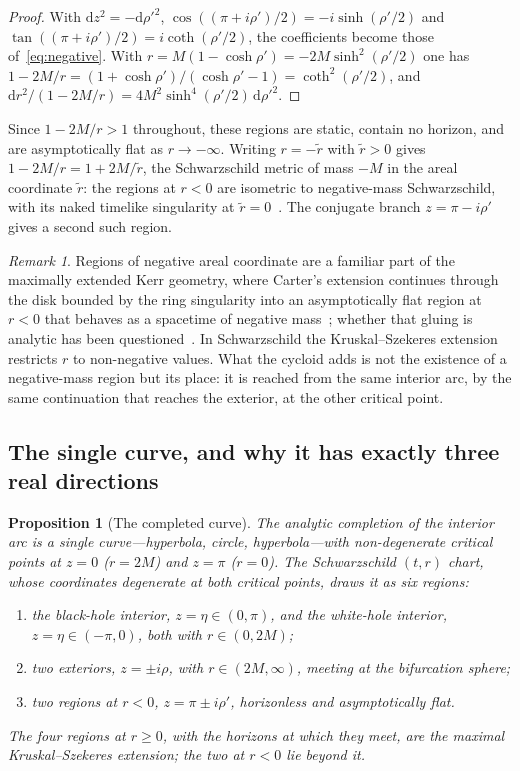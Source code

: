 \documentclass{iopjournal}
\theoremstyle{plain}
\newtheorem{proposition}[theorem]{Proposition}
\theoremstyle{remark}
\newtheorem{remark}[theorem]{Remark}
\newcommand{\dd}{\mathrm{d}}
\begin{document}
\begin{proof}
With $\dd z^{2}=-\dd\rho'^{2}$, $\cos((\pi+i\rho')/2)=-i\sinh(\rho'/2)$ and $\tan((\pi+i\rho')/2)=i\coth(\rho'/2)$, the coefficients become those of~\eqref{eq:negative}. With $r=M(1-\cosh\rho')=-2M\sinh^{2}(\rho'/2)$ one has $1-2M/r=(1+\cosh\rho')/(\cosh\rho'-1)=\coth^{2}(\rho'/2)$, and $\dd r^{2}/(1-2M/r)=4M^{2}\sinh^{4}(\rho'/2)\,\dd\rho'^{2}$.
\end{proof}

Since $1-2M/r>1$ throughout, these regions are static, contain no horizon, and are asymptotically flat as $r\to-\infty$. Writing $r=-\tilde r$ with $\tilde r>0$ gives $1-2M/r=1+2M/\tilde r$, the Schwarzschild metric of mass $-M$ in the areal coordinate $\tilde r$: the regions at $r<0$ are isometric to negative-mass Schwarzschild, with its naked timelike singularity at $\tilde r=0$~\cite{Bondi1957}. The conjugate branch $z=\pi-i\rho'$ gives a second such region.

\begin{remark}
Regions of negative areal coordinate are a familiar part of the maximally extended Kerr geometry, where Carter's extension continues through the disk bounded by the ring singularity into an asymptotically flat region at $r<0$ that behaves as a spacetime of negative mass~\cite{Carter1968}; whether that gluing is analytic has been questioned~\cite{GarciaCompeanManko2012}. In Schwarzschild the Kruskal--Szekeres extension restricts $r$ to non-negative values. What the cycloid adds is not the existence of a negative-mass region but its place: it is reached from the same interior arc, by the same continuation that reaches the exterior, at the other critical point.
\end{remark}

\subsection{The single curve, and why it has exactly three real directions}

\begin{proposition}[The completed curve]\label{prop:curve}
The analytic completion of the interior arc is a single curve---hyperbola, circle, hyperbola---with non-degenerate critical points at $z=0$ ($r=2M$) and $z=\pi$ ($r=0$). The Schwarzschild $(t,r)$ chart, whose coordinates degenerate at both critical points, draws it as six regions:
\begin{enumerate}
\item the black-hole interior, $z=\eta\in(0,\pi)$, and the white-hole interior, $z=\eta\in(-\pi,0)$, both with $r\in(0,2M)$;
\item two exteriors, $z=\pm i\rho$, with $r\in(2M,\infty)$, meeting at the bifurcation sphere;
\item two regions at $r<0$, $z=\pi\pm i\rho'$, horizonless and asymptotically flat.
\end{enumerate}
The four regions at $r\geq0$, with the horizons at which they meet, are the maximal Kruskal--Szekeres extension; the two at $r<0$ lie beyond it.
\end{proposition}
\end{document}
